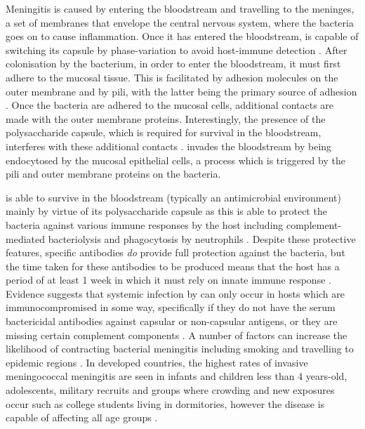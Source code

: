 Meningitis is caused by \Nm\space entering the bloodstream and travelling to the meninges, a set of membranes that envelope the central nervous system, where the bacteria goes on to cause inflammation. Once it has entered the bloodstream, \Nm\space is capable of switching its capsule by phase-variation to avoid host-immune detection \cite{AmandaJBeddek05182009,Moxon199424}. After colonisation by the bacterium, in order to enter the bloodstream, it must first adhere to the mucosal tissue. This is facilitated by adhesion molecules on the outer membrane and by pili, with the latter being the primary source of adhesion \cite{MarcelvanDeuren01012000,Carbonnelle2009B78}. Once the bacteria are adhered to the mucosal cells, additional contacts are made with the outer membrane proteins. Interestingly, the presence of the polysaccharide capsule, which is required for survival in the bloodstream, interferes with these additional contacts \cite{Stephens2009B71}. \Nm\space invades the bloodstream by being endocytosed by the mucosal epithelial cells, a process which is triggered by the pili and outer membrane proteins on the bacteria.

\Nm\space is able to survive in the bloodstream (typically an antimicrobial environment) mainly by virtue of its polysaccharide capsule as this is able to protect the bacteria against various immune responses by the host including complement-mediated bacteriolysis and phagocytosis by neutrophils \cite{MarcelvanDeuren01012000}.
 Despite these protective features, specific antibodies \textit{do} provide full protection against the bacteria, but the time taken for these antibodies to be produced means that the host has a period of at least 1 week in which it must rely on innate immune response \cite{MarcelvanDeuren01012000}. Evidence suggests that systemic infection by \Nm\space can only occur in hosts which are immunocompromised in some way, specifically if they do not have the serum bactericidal antibodies against capsular or non-capsular antigens, or they are missing certain complement components \cite{IWDeVoe06011982}. A number of factors can increase the likelihood of contracting bacterial meningitis including smoking and travelling to epidemic regions \cite{Stephens2009B71}. In developed countries, the highest rates of invasive meningococcal meningitis are seen in infants and children less than 4 years-old, adolescents, military recruits and groups where crowding and new exposures occur such as college students living in dormitories, however the disease is capable of affecting all age groups \cite{Stephens2009B71}.

